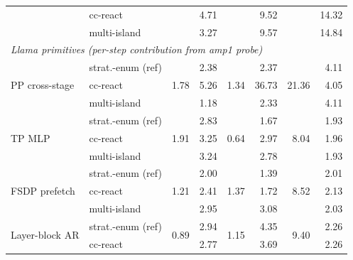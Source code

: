 \begin{table}[!htbp]
\begin{tabular}{llrrrrrr}
                                & cc-react           &                       &  4.71 &                       &  9.52 &                        & 14.32 \\
                                & multi-island       &                       &  3.27 &                       &  9.57 &                        & 14.84 \\
\midrule
\multicolumn{8}{l}{\textit{Llama primitives (per-step contribution from amp1 probe)}} \\
\multirow{3}{*}{PP cross-stage} & strat.-enum (ref)  & \multirow{3}{*}{1.78} &  2.38 & \multirow{3}{*}{1.34} &  2.37 & \multirow{3}{*}{21.36} &  4.11 \\
                                & cc-react           &                       &  5.26 &                       & 36.73 &                        &  4.05 \\
                                & multi-island       &                       &  1.18 &                       &  2.33 &                        &  4.11 \\
\midrule
\multirow{3}{*}{TP MLP}         & strat.-enum (ref)  & \multirow{3}{*}{1.91} &  2.83 & \multirow{3}{*}{0.64} &  1.67 & \multirow{3}{*}{8.04} &  1.93 \\
                                & cc-react           &                       &  3.25 &                       &  2.97 &                       &  1.96 \\
                                & multi-island       &                       &  3.24 &                       &  2.78 &                       &  1.93 \\
\midrule
\multirow{3}{*}{FSDP prefetch}  & strat.-enum (ref)  & \multirow{3}{*}{1.21} &  2.00 & \multirow{3}{*}{1.37} &  1.39 & \multirow{3}{*}{8.52} &  2.01 \\
                                & cc-react           &                       &  2.41 &                       &  1.72 &                       &  2.13 \\
                                & multi-island       &                       &  2.95 &                       &  3.08 &                       &  2.03 \\
\midrule
\multirow{3}{*}{Layer-block AR} & strat.-enum (ref)  & \multirow{3}{*}{0.89} &  2.94 & \multirow{3}{*}{1.15} &  4.35 & \multirow{3}{*}{9.40} &  2.26 \\
                                & cc-react           &                       &  2.77 &                       &  3.69 &                       &  2.26 \\

\end{tabular}
\end{table}
